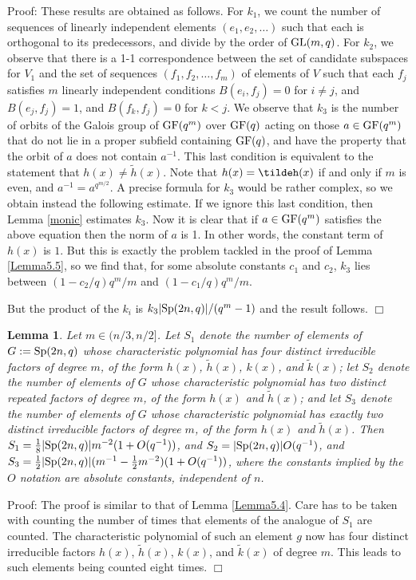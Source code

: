 \documentclass[12pt]{article}
\newtheorem{lemma}[definition]{Lemma}
\newenvironment{proof}{\normalsize {\sc Proof}:}{{\hfill $\Box$ \\}}
\def\GL{{\rm GL}}
\def\GF{{\rm GF}}
\def\Sp{{\rm Sp}}
\begin{document}
\begin{proof}
These results are obtained as follows. For $k_1$, we count the number of
sequences of linearly  independent  elements $(e_1,e_2,\ldots)$  such
that each is orthogonal to its predecessors, and divide by the order
of $\GL(m,q)$. For $k_2$, we observe that there is a 1-1
correspondence between the set of candidate subspaces for $V_1$ and
the set of sequences $(f_1,f_2,\ldots,f_m)$ of elements of $V$ such that
each $f_j$ satisfies $m$ linearly independent conditions
$B(e_i,f_j)=0$ for $i \ne j$, and $B(e_j,f_j)=1$, and $B(f_k,f_j)=0$ for $k < j$.
We observe that $k_3$ is the number of orbits of the Galois group of
$\GF(q^m)$ over $\GF(q)$ acting on those $a \in \GF(q^m)$ that 
do not lie
in a proper subfield containing $\GF(q)$, and have the property that 
the orbit of $a$ does not contain $a^{-1}$.  This last condition is equivalent to the
statement that $h(x)\ne \tilde{h}(x)$.   Note that $h(x)=\tildeh(x)$ if and only if
$m$ is even, and $a^{-1}=a^{q^{m/2}}$.
A precise formula for $k_3$
would be rather complex, so we obtain instead the following
estimate. If we ignore this last condition, then
Lemma \ref{monic} estimates $k_3$.
Now it is clear that if $a\in\GF(q^m)$ satisfies the
above equation then the norm of $a$ is 1. In other words, the
constant term of $h(x)$ is $1$. But this is exactly the problem tackled in
the proof of Lemma \ref{Lemma5.5}, so we find that, for some
absolute constants $c_1$ and $c_2$, $k_3$ lies between $(1-c_2 /q)q^m/m$ and
$(1-c_1 /q)q^m/m$. 

But the product of the $k_i$ is
$k_3\vert\Sp(2n,q)\vert/(q^m-1)$ and the result follows. 
\end{proof}

\begin{lemma}\label{Lemma5.9} Let $m\in(n/3,n/2]$. 
Let $S_1$ denote the number of elements of $G:=\Sp(2n,q)$ whose characteristic polynomial
has four distinct irreducible factors of degree $m$, of the form $h(x)$, $\tilde h(x)$,
$k(x)$, and $\tilde k(x)$;
 let $S_2$ denote the number
of elements of $G$ whose characteristic polynomial has two distinct repeated factors of
degree $m$, of the form $h(x)$ and $\tilde h(x)$; and let $S_3$ denote the number 
of elements of $G$ whose characteristic
polynomial has exactly two distinct irreducible factors of degree $m$,
of the form $h(x)$ and $\tilde h(x)$. 
Then $S_1={1\over8}\vert\Sp(2n,q)\vert m^{-2}(1+O(q^{-1}))$, and 
$S_2=\vert\Sp(2n,q)\vert O(q^{-1})$, 
and $S_3={1\over2}\vert\Sp(2n,q)\vert(m^{-1}-{1\over2}m^{-2})(1+O(q^{-1}))$,
where the constants implied by the $O$ notation are absolute constants,
independent of $n$.
\end{lemma}
\begin{proof} 
The proof is similar to that of Lemma \ref{Lemma5.4}.  Care has to
be taken with counting the number of times that elements of the analogue
of $S_1$ are counted.  The characteristic polynomial of such an element
$g$ now has four distinct irreducible factors $h(x)$, $\tilde h(x)$, $k(x)$,
and $\tilde k(x)$ of degree $m$.  This leads to such elements being counted eight times.
\end{proof}
\end{document}
